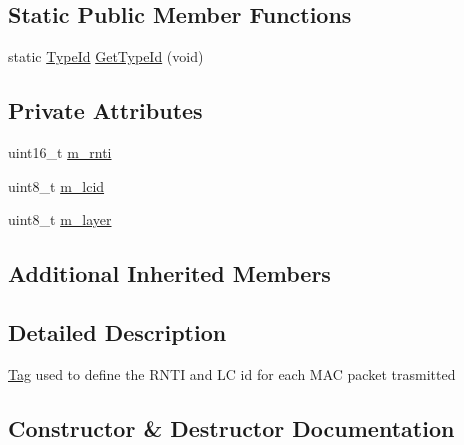 \subsection*{Static Public Member Functions}
\begin{DoxyCompactItemize}
\item 
static \hyperlink{classns3_1_1TypeId}{Type\+Id} \hyperlink{classns3_1_1LteRadioBearerTag_a3f782717b3fbb68c625f10c61081c0a6}{Get\+Type\+Id} (void)
\end{DoxyCompactItemize}
\subsection*{Private Attributes}
\begin{DoxyCompactItemize}
\item 
uint16\+\_\+t \hyperlink{classns3_1_1LteRadioBearerTag_a45bd7ed9cbfb44c57a284348819bd7c3}{m\+\_\+rnti}
\item 
uint8\+\_\+t \hyperlink{classns3_1_1LteRadioBearerTag_ae069f6e1dde90d3473c153e02fd9a07f}{m\+\_\+lcid}
\item 
uint8\+\_\+t \hyperlink{classns3_1_1LteRadioBearerTag_a8f05cefba17f07a9772a48dce2fa2baf}{m\+\_\+layer}
\end{DoxyCompactItemize}
\subsection*{Additional Inherited Members}


\subsection{Detailed Description}
\hyperlink{classns3_1_1Tag}{Tag} used to define the R\+N\+TI and LC id for each M\+AC packet trasmitted 

\subsection{Constructor \& Destructor Documentation}
